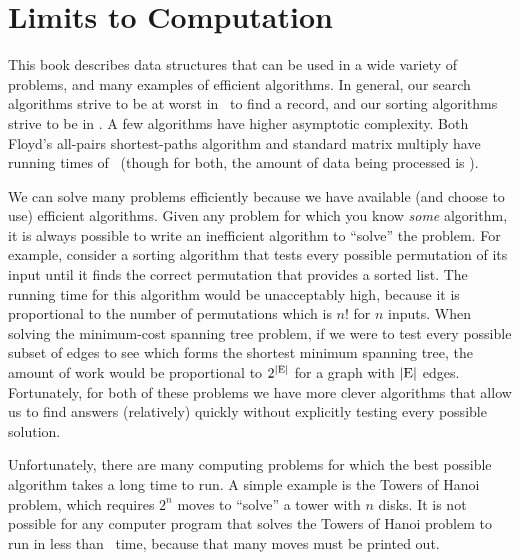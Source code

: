 
\chapter{Limits to Computation}
\label{LimComp}
\def\CHHEAD{Chap.\ \thechapter\ Limits to Computation}    %

This book describes data structures that can be used in a wide
variety of problems, and many examples of efficient algorithms.
In general, our search algorithms strive to be at worst in \Ologn\ to
find a record,
and our sorting algorithms strive to be in \Onlogn.
A few algorithms have higher asymptotic complexity.
Both Floyd's
all-pairs
shortest-paths algorithm and standard matrix multiply have 
running times of \Thetanthree\ (though for both, the amount of
data being processed is \Thetantwo).

We can solve many problems efficiently because we have available 
(and choose to use) efficient algorithms.
Given any problem for which you know \emph{some} algorithm, it is
always possible to write an inefficient algorithm to
``solve'' the problem.
For example, consider a sorting algorithm that tests every possible
permutation of its input until it finds the correct permutation that
provides a sorted list.
The running time for this algorithm would be unacceptably
high, because it is proportional to the number of permutations which
is \(n!\) for \(n\) inputs.
When solving the minimum-cost spanning tree problem, if we were to
test every possible subset of edges to see which forms the shortest
minimum spanning tree, the amount of work would be proportional to
\(2^{|{\rm E}|}\) for a graph with \(|{\rm E}|\) edges.
Fortunately, for both of these problems we have more clever
algorithms that allow us to find answers (relatively) quickly without
explicitly testing every possible solution.

Unfortunately, there are many computing problems for which the best
possible algorithm takes a long time to run.
A simple example is the Towers of Hanoi problem, which requires
\(2^n\) moves to ``solve'' a tower with \(n\)
disks.
It is not possible for any computer program that solves the Towers of
Hanoi problem to run in less than \Omegatwon\ time, because that many
moves must be printed out.

